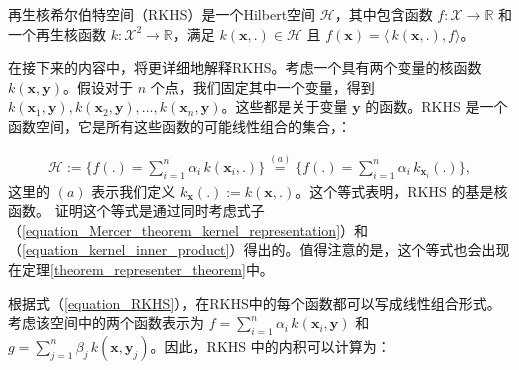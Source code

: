 \documentclass[lang=cn,10pt]{gorgeousnbook}
\numberwithin{equation}{section}%
\numberwithin{figure}{section}%
\begin{document}
\begin{definition}\label{definition_RKHS}
再生核希尔伯特空间（RKHS）是一个Hilbert空间 $\mathcal{H}$，其中包含函数 $f: \mathcal{X} \rightarrow \mathbb{R}$ 和一个再生核函数 $k: \mathcal{X}^2 \rightarrow \mathbb{R}$，满足 $k(\boldsymbol{x}, .) \in \mathcal{H}$ 且 $f(\boldsymbol{x}) = \langle\,k(\boldsymbol{x},.),f\rangle$。
\end{definition}

在接下来的内容中，将更详细地解释RKHS。考虑一个具有两个变量的核函数 $k(\boldsymbol{x}, \boldsymbol{y})$。假设对于 $n$ 个点，我们固定其中一个变量，得到 $k(\boldsymbol{x}_1, \boldsymbol{y}), k(\boldsymbol{x}_2, \boldsymbol{y}), \dots, k(\boldsymbol{x}_n, \boldsymbol{y})$。这些都是关于变量 $\boldsymbol{y}$ 的函数。RKHS 是一个函数空间，它是所有这些函数的可能线性组合的集合\cite{kimeldorf1971some}，\cite{mercer1909functions}：

\begin{align}\label{equation_RKHS}
\mathcal{H} :=\! \Big\{f(.) = \sum_{i=1}^n \alpha_i\, k(\boldsymbol{x}_i, .)\Big\} \!\overset{(a)}{=}\! \Big\{f(.) = \sum_{i=1}^n \alpha_i\, k_{\boldsymbol{x}_i}(.)\Big\},
\end{align}
这里的 $(a)$ 表示我们定义 $k_{\boldsymbol{x}}(.) := k(\boldsymbol{x}, .)$。这个等式表明，RKHS 的基是核函数。
证明这个等式是通过同时考虑式子（\ref{equation_Mercer_theorem_kernel_representation}）和（\ref{equation_kernel_inner_product}）得出的。值得注意的是，这个等式也会出现在定理\ref{theorem_representer_theorem}中。

根据式（\ref{equation_RKHS}），在RKHS中的每个函数都可以写成线性组合形式。考虑该空间中的两个函数表示为 $f = \sum_{i=1}^n \alpha_i\, k(\boldsymbol{x}_i, \boldsymbol{y})$ 和 $g = \sum_{j=1}^n \beta_j\, k(\boldsymbol{x}, \boldsymbol{y}_j)$。因此，RKHS 中的内积可以计算为：
\end{document}
